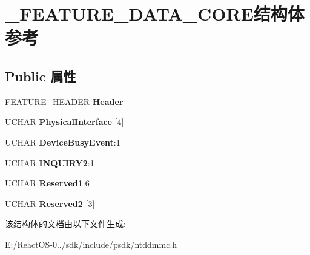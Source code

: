 \hypertarget{struct___f_e_a_t_u_r_e___d_a_t_a___c_o_r_e}{}\section{\+\_\+\+F\+E\+A\+T\+U\+R\+E\+\_\+\+D\+A\+T\+A\+\_\+\+C\+O\+R\+E结构体 参考}
\label{struct___f_e_a_t_u_r_e___d_a_t_a___c_o_r_e}
\subsection*{Public 属性}
\begin{DoxyCompactItemize}
\item 
\mbox{\label{struct___f_e_a_t_u_r_e___d_a_t_a___c_o_r_e_a190be6d9f98a8433788dbedfd2d91e6b}} 
\hyperlink{struct___f_e_a_t_u_r_e___h_e_a_d_e_r}{F\+E\+A\+T\+U\+R\+E\+\_\+\+H\+E\+A\+D\+ER} {\bfseries Header}
\item 
\mbox{\label{struct___f_e_a_t_u_r_e___d_a_t_a___c_o_r_e_a5a8c5c379691d194da4deaa8498e6019}} 
U\+C\+H\+AR {\bfseries Physical\+Interface} \mbox{[}4\mbox{]}
\item 
\mbox{\label{struct___f_e_a_t_u_r_e___d_a_t_a___c_o_r_e_a73cc708e82c5babbc5467192c2f830b1}} 
U\+C\+H\+AR {\bfseries Device\+Busy\+Event}\+:1
\item 
\mbox{\label{struct___f_e_a_t_u_r_e___d_a_t_a___c_o_r_e_a39c267357b3947742cb11ad5b3818fb4}} 
U\+C\+H\+AR {\bfseries I\+N\+Q\+U\+I\+R\+Y2}\+:1
\item 
\mbox{\label{struct___f_e_a_t_u_r_e___d_a_t_a___c_o_r_e_a8f379dab77aa0422298df4d96c5bddb1}} 
U\+C\+H\+AR {\bfseries Reserved1}\+:6
\item 
\mbox{\label{struct___f_e_a_t_u_r_e___d_a_t_a___c_o_r_e_aaeb19d67aa430c27cd6eed20008e130e}} 
U\+C\+H\+AR {\bfseries Reserved2} \mbox{[}3\mbox{]}
\end{DoxyCompactItemize}


该结构体的文档由以下文件生成\+:\begin{DoxyCompactItemize}
\item 
E\+:/\+React\+O\+S-\/0../sdk/include/psdk/ntddmmc.\+h\end{DoxyCompactItemize}

